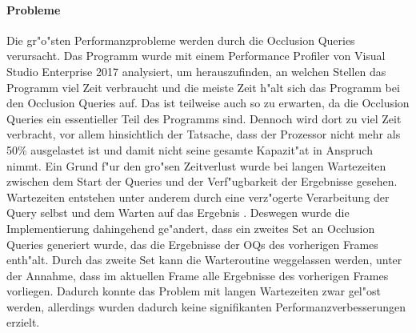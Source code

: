 \documentclass[journal]{vgtc}
\begin{document}
\paragraph{Probleme} Die gr"o"sten Performanzprobleme werden durch die Occlusion Queries verursacht.
Das Programm wurde mit einem Performance Profiler von Visual Studio Enterprise 2017 analysiert, um herauszufinden, an welchen Stellen das Programm viel Zeit verbraucht und die meiste Zeit h"alt sich das Programm bei den Occlusion Queries auf.
Das ist teilweise auch so zu erwarten, da die Occlusion Queries ein essentieller Teil des Programms sind. Dennoch wird dort zu viel Zeit verbracht, vor allem hinsichtlich der Tatsache, dass der Prozessor nicht mehr als 50\% ausgelastet ist und damit nicht seine gesamte Kapazit"at in Anspruch nimmt.
Ein Grund f"ur den gro"sen Zeitverlust wurde bei langen Wartezeiten zwischen dem Start der Queries und der Verf"ugbarkeit der Ergebnisse gesehen. Wartezeiten entstehen unter anderem durch eine verz"ogerte Verarbeitung der Query selbst und dem Warten auf das Ergebnis \cite{OQMU}.
Deswegen wurde die Implementierung dahingehend ge"andert, dass ein zweites Set an Occlusion Queries generiert wurde, das die Ergebnisse der OQs des vorherigen Frames enth"alt.
Durch das zweite Set kann die Warteroutine weggelassen werden, unter der Annahme, dass im aktuellen Frame alle Ergebnisse des vorherigen Frames vorliegen.
Dadurch konnte das Problem mit langen Wartezeiten zwar gel"ost werden, allerdings wurden dadurch keine signifikanten Performanzverbesserungen erzielt.

%
%
%
%
\end{document}
